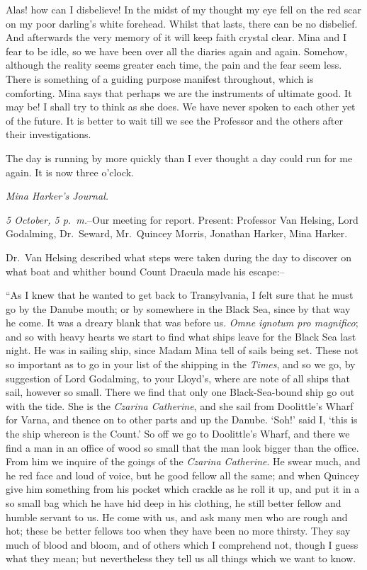 \documentclass[12pt,openright]{book}
\begin{document}
Alas! how can I disbelieve! In the midst of my thought my eye fell on the red scar on my poor darling’s white forehead. Whilst that lasts, there can be no disbelief. And afterwards the very memory of it will keep faith crystal clear. Mina and I fear to be idle, so we have been over all the diaries again and again. Somehow, although the reality seems greater each time, the pain and the fear seem less. There is something of a guiding purpose manifest throughout, which is comforting. Mina says that perhaps we are the instruments of ultimate good. It may be! I shall try to think as she does. We have never spoken to each other yet of the future. It is better to wait till we see the Professor and the others after their investigations.

The day is running by more quickly than I ever thought a day could run for me again. It is now three o’clock.

\textit{Mina Harker’s Journal.}

\textit{5 October, 5 p. m.}–Our meeting for report. Present: Professor Van Helsing, Lord Godalming, Dr. Seward, Mr. Quincey Morris, Jonathan Harker, Mina Harker.

Dr. Van Helsing described what steps were taken during the day to discover on what boat and whither bound Count Dracula made his escape:–

“As I knew that he wanted to get back to Transylvania, I felt sure that he must go by the Danube mouth; or by somewhere in the Black Sea, since by that way he come. It was a dreary blank that was before us. \textit{Omne}\textit{ }\textit{ignotum pro magnifico}; and so with heavy hearts we start to find what ships leave for the Black Sea last night. He was in sailing ship, since Madam Mina tell of sails being set. These not so important as to go in your list of the shipping in the \textit{Times}, and so we go, by suggestion of Lord Godalming, to your Lloyd’s, where are note of all ships that sail, however so small. There we find that only one Black-Sea-bound ship go out with the tide. She is the \textit{Czarina Catherine}, and she sail from Doolittle’s Wharf for Varna, and thence on to other parts and up the Danube. ‘Soh!’ said I, ‘this is the ship whereon is the Count.’ So off we go to Doolittle’s Wharf, and there we find a man in an office of wood so small that the man look bigger than the office. From him we inquire of the goings of the \textit{Czarina Catherine}. He swear much, and he red face and loud of voice, but he good fellow all the same; and when Quincey give him something from his pocket which crackle as he roll it up, and put it in a so small bag which he have hid deep in his clothing, he still better fellow and humble servant to us. He come with us, and ask many men who are rough and hot; these be better fellows too when they have been no more thirsty. They say much of blood and bloom, and of others which I comprehend not, though I guess what they mean; but nevertheless they tell us all things which we want to know.
\end{document}
